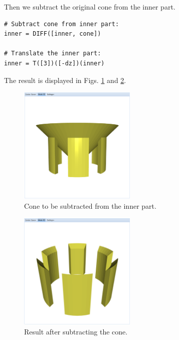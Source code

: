 \documentclass{article}
\begin{document}
\noindent
Then we subtract the original cone from the inner part. 
{\small
\begin{verbatim}
# Subtract cone from inner part:
inner = DIFF([inner, cone])

# Translate the inner part:
inner = T([3])([-dz])(inner)
\end{verbatim}
}
\noindent
The result is displayed in Figs. \ref{fig:gear-10} and \ref{fig:gear-12}.
\newpage

\begin{figure}[!ht]
\begin{center}
\includegraphics[width=0.5\textwidth]{img/gear-10.png}
\end{center}
\vspace{-2mm}
\caption{Cone to be subtracted from the inner part.}
\label{fig:gear-10}
\end{figure}
\noindent

\begin{figure}[!ht]
\begin{center}
\includegraphics[width=0.5\textwidth]{img/gear-12.png}
\end{center}
\vspace{-2mm}
\caption{Result after subtracting the cone.}
\label{fig:gear-12}
\end{figure}
\end{document}
